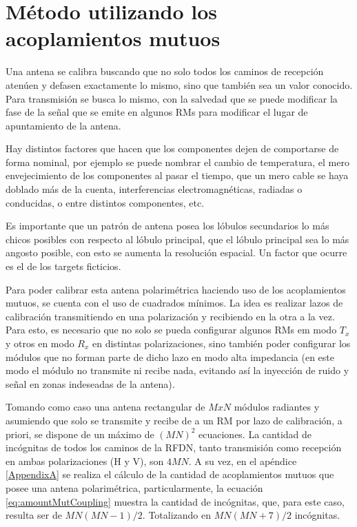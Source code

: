 \chapter{Método utilizando los acoplamientos mutuos}
\label{ch:estado}
Una antena se calibra buscando que no solo todos los caminos de recepción atenúen y defasen exactamente lo mismo, sino que 
también sea un valor conocido. Para transmisión se busca lo mismo, con la salvedad que se puede modificar la fase de la 
señal que se emite en algunos RMs para modificar el lugar de apuntamiento de la antena.

Hay distintos factores que hacen que los componentes dejen de comportarse de forma nominal, por ejemplo se puede nombrar el
cambio de temperatura, el mero envejecimiento de los componentes al pasar el tiempo, que un mero cable se haya doblado más
de la cuenta, interferencias electromagnéticas, radiadas o conducidas, o entre distintos componentes, etc. 

Es importante que un patrón de antena posea los lóbulos secundarios lo más chicos posibles con respecto al lóbulo principal,
que el lóbulo principal sea lo más angosto posible, con esto se aumenta la resolución espacial. Un factor que ocurre es el 
de los targets ficticios.



Para poder calibrar esta antena polarimétrica haciendo uso de los acoplamientos mutuos, se cuenta con el uso de 
cuadrados mínimos. La idea es realizar lazos de calibración transmitiendo en una polarización y recibiendo en la
otra a la vez. Para esto, es necesario que no solo se pueda configurar algunos RMs em modo $T_x$ y otros en modo $R_x$ en 
distintas polarizaciones, sino también poder configurar los módulos que no forman parte de dicho lazo en modo alta 
impedancia (en este modo el módulo no transmite ni recibe nada, evitando así la inyección de ruido y señal en zonas 
indeseadas de la antena). 

Tomando como caso una antena rectangular de $M x N$ módulos radiantes y asumiendo que solo se transmite y recibe de a un 
RM por lazo de calibración, a priori, se dispone de un máximo de $(MN)^2$ ecuaciones. La cantidad de incógnitas de todos
los caminos de la RFDN, tanto transmisión como recepción en ambas polarizaciones (H y V), son $4MN$. A su vez, en el 
apéndice \ref{AppendixA} se realiza el cálculo de la cantidad de acoplamientos mutuos que posee una antena polarimétrica,
particularmente, la ecuación \ref{eq:amountMutCoupling} muestra la cantidad de incógnitas, que, para este caso, resulta 
ser de $MN(MN-1)/2$. Totalizando en $MN(MN + 7)/2$ incógnitas.

